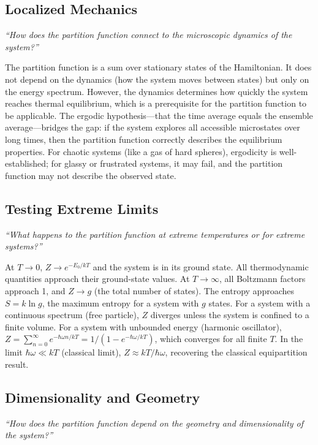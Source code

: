 \documentclass[11pt,openright]{book}
\begin{document}
\subsection*{Localized Mechanics}
\textit{``How does the partition function connect to the microscopic dynamics of the system?''}

The partition function is a sum over stationary states of the Hamiltonian. It does not depend on the dynamics (how the system moves between states) but only on the energy spectrum. However, the dynamics determines how quickly the system reaches thermal equilibrium, which is a prerequisite for the partition function to be applicable. The ergodic hypothesis---that the time average equals the ensemble average---bridges the gap: if the system explores all accessible microstates over long times, then the partition function correctly describes the equilibrium properties. For chaotic systems (like a gas of hard spheres), ergodicity is well-established; for glassy or frustrated systems, it may fail, and the partition function may not describe the observed state.

\subsection*{Testing Extreme Limits}
\textit{``What happens to the partition function at extreme temperatures or for extreme systems?''}

At $T \to 0$, $Z \to e^{-E_{0}/kT}$ and the system is in its ground state. All thermodynamic quantities approach their ground-state values. At $T \to \infty$, all Boltzmann factors approach 1, and $Z \to g$ (the total number of states). The entropy approaches $S = k\ln g$, the maximum entropy for a system with $g$ states. For a system with a continuous spectrum (free particle), $Z$ diverges unless the system is confined to a finite volume. For a system with unbounded energy (harmonic oscillator), $Z = \sum_{n=0}^{\infty} e^{-\hbar\omega n/kT} = 1/(1 - e^{-\hbar\omega/kT})$, which converges for all finite $T$. In the limit $\hbar\omega \ll kT$ (classical limit), $Z \approx kT/\hbar\omega$, recovering the classical equipartition result.

\subsection*{Dimensionality and Geometry}
\textit{``How does the partition function depend on the geometry and dimensionality of the system?''}
\end{document}
